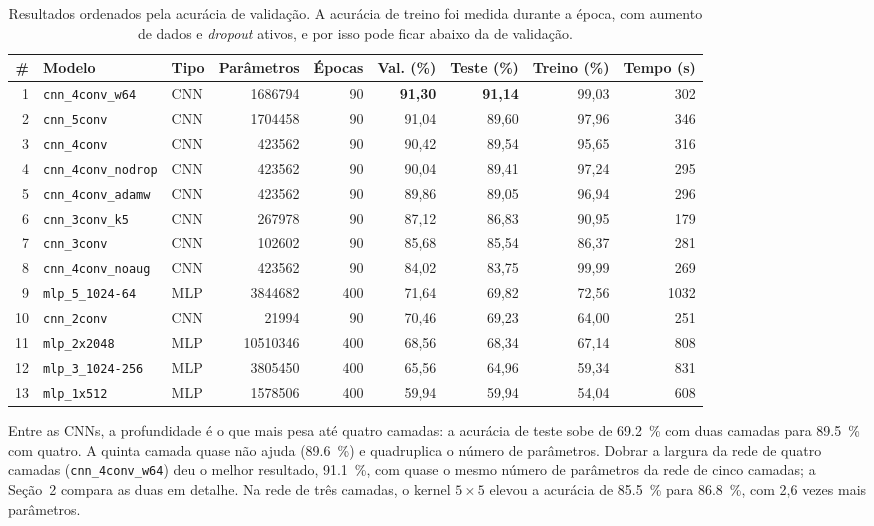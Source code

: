 \documentclass[11pt,a4paper]{article}
\newcommand{\code}[1]{\texttt{#1}}
\begin{document}
\begin{table}[H]
\centering
\caption{Resultados ordenados pela acurácia de validação. A acurácia de treino foi medida durante a época, com aumento de dados e \textit{dropout} ativos, e por isso pode ficar abaixo da de validação.}
\label{tab:ranking}
\small
\setlength{\tabcolsep}{4pt}
\begin{tabular}{rllrrrrrr}
\toprule
\# & Modelo & Tipo & Parâmetros & Épocas & Val. (\%) & Teste (\%) & Treino (\%) & Tempo (s) \\
\midrule
 1 & \code{cnn\_4conv\_w64}    & CNN & \num{1686794}  & 90  & \textbf{91,30} & \textbf{91,14} & 99,03 & 302 \\
 2 & \code{cnn\_5conv}         & CNN & \num{1704458}  & 90  & 91,04 & 89,60 & 97,96 & 346 \\
 3 & \code{cnn\_4conv}         & CNN & \num{423562}   & 90  & 90,42 & 89,54 & 95,65 & 316 \\
 4 & \code{cnn\_4conv\_nodrop} & CNN & \num{423562}   & 90  & 90,04 & 89,41 & 97,24 & 295 \\
 5 & \code{cnn\_4conv\_adamw}  & CNN & \num{423562}   & 90  & 89,86 & 89,05 & 96,94 & 296 \\
 6 & \code{cnn\_3conv\_k5}     & CNN & \num{267978}   & 90  & 87,12 & 86,83 & 90,95 & 179 \\
 7 & \code{cnn\_3conv}         & CNN & \num{102602}   & 90  & 85,68 & 85,54 & 86,37 & 281 \\
 8 & \code{cnn\_4conv\_noaug}  & CNN & \num{423562}   & 90  & 84,02 & 83,75 & 99,99 & 269 \\
 9 & \code{mlp\_5\_1024-64}    & MLP & \num{3844682}  & 400 & 71,64 & 69,82 & 72,56 & 1032 \\
10 & \code{cnn\_2conv}         & CNN & \num{21994}    & 90  & 70,46 & 69,23 & 64,00 & 251 \\
11 & \code{mlp\_2x2048}        & MLP & \num{10510346} & 400 & 68,56 & 68,34 & 67,14 & 808 \\
12 & \code{mlp\_3\_1024-256}   & MLP & \num{3805450}  & 400 & 65,56 & 64,96 & 59,34 & 831 \\
13 & \code{mlp\_1x512}         & MLP & \num{1578506}  & 400 & 59,94 & 59,94 & 54,04 & 608 \\
\bottomrule
\end{tabular}
\end{table}

Entre as CNNs, a profundidade é o que mais pesa até quatro camadas: a acurácia de teste sobe de \SI{69,2}{\percent} com duas camadas para \SI{89,5}{\percent} com quatro. A quinta camada quase não ajuda (\SI{89,6}{\percent}) e quadruplica o número de parâmetros. Dobrar a largura da rede de quatro camadas (\code{cnn\_4conv\_w64}) deu o melhor resultado, \SI{91,1}{\percent}, com quase o mesmo número de parâmetros da rede de cinco camadas; a Seção~2 compara as duas em detalhe. Na rede de três camadas, o kernel $5\times5$ elevou a acurácia de \SI{85,5}{\percent} para \SI{86,8}{\percent}, com 2,6 vezes mais parâmetros.
\end{document}
